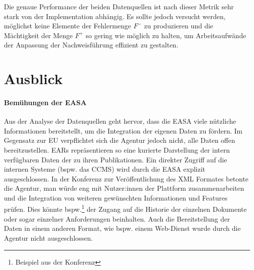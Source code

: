 
\medskip
Die genaue Performance der beiden Datenquellen ist nach dieser Metrik sehr stark von der Implementation abhängig. 
Es sollte jedoch versucht werden, möglichst keine Elemente der Fehlermenge $F^-$ zu produzieren und die Mächtigkeit der Menge $F^+$ so gering wie möglich zu halten, um Arbeitsaufwände der Anpassung der Nachweisführung effizient zu gestalten.
    

\chapter{Ausblick}\label{ch:ausblick}
    
    \subsubsection{Bemühungen der EASA}

        Aus der Analyse der Datenquellen geht hervor, dass die \ac{EASA} viele nützliche Informationen bereitstellt, um die Integration der eigenen Daten zu fördern.
        Im Gegensatz zur \ac{EU} verpflichtet sich die Agentur jedoch nicht, alle Daten offen bereitzustellen.
        \acp{EAR} repräsentieren so eine kurierte Darstellung der intern verfügbaren Daten der zu ihren Publikationen.
        Ein direkter Zugriff auf die internen Systeme (bspw. das \ac{CCMS}) wird durch die \ac{EASA} explizit ausgeschlossen.
        In der Konferenz zur Veröffentlichung des \ac{XML} Formates \cite{easa_xml_publication} betonte die Agentur, man würde eng mit Nutzer:innen der Plattform zusammenarbeiten und die Integration von weiteren gewünschten Informationen und Features prüfen.
        Dies könnte bspw.\footnote{Beispiel aus der Konferenz} der Zugang auf die Historie der einzelnen Dokumente oder sogar einzelner Anforderungen beinhalten.
        Auch die Bereitstellung der Daten in einem anderen Format, wie bspw. einem Web-Dienst wurde durch die Agentur nicht ausgeschlossen.

